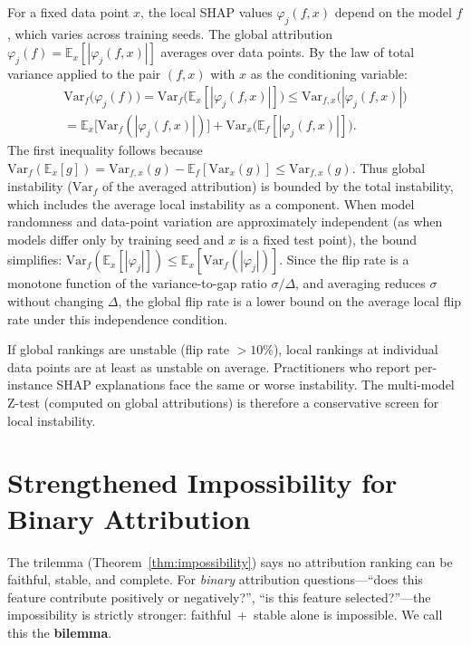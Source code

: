 \documentclass{jmlr}
\newcommand{\E}{\mathbb{E}}
\newcommand{\Var}{\mathrm{Var}}
\begin{document}
For a fixed data point $x$, the local SHAP values $\varphi_j(f, x)$ depend on the model $f$, which varies across training seeds. The global attribution $\varphi_j(f) = \E_x[|\varphi_j(f, x)|]$ averages over data points. By the law of total variance applied to the pair $(f, x)$ with $x$ as the conditioning variable:
\begin{multline*}
    \Var_f\!\big(\varphi_j(f)\big) = \Var_f\!\big(\E_x[|\varphi_j(f,x)|]\big) \leq \Var_{f,x}\!\big(|\varphi_j(f,x)|\big) \\
    = \E_x\!\big[\Var_f(|\varphi_j(f,x)|)\big] + \Var_x\!\big(\E_f[|\varphi_j(f,x)|]\big).
\end{multline*}
The first inequality follows because $\Var_f(\E_x[g]) = \Var_{f,x}(g) - \E_f[\Var_x(g)] \leq \Var_{f,x}(g)$.
Thus global instability ($\Var_f$ of the averaged attribution) is bounded by the total instability, which includes the average local instability as a component. When model randomness and data-point variation are approximately independent (as when models differ only by training seed and $x$ is a fixed test point), the bound simplifies: $\Var_f(\E_x[|\varphi_j|]) \leq \E_x[\Var_f(|\varphi_j|)]$.
Since the flip rate is a monotone function of the variance-to-gap ratio $\sigma/\Delta$, and averaging reduces $\sigma$ without changing $\Delta$, the global flip rate is a lower bound on the average local flip rate under this independence condition.

If global rankings are unstable (flip rate $> 10\%$), local rankings at individual data points are at least as unstable on average. Practitioners who report per-instance SHAP explanations face the same or worse instability. The multi-model Z-test (computed on global attributions) is therefore a conservative screen for local instability.


\section{Strengthened Impossibility for Binary Attribution}
\label{sec:bilemma}

The trilemma (Theorem~\ref{thm:impossibility}) says no attribution ranking can be faithful, stable, and complete.
For \emph{binary} attribution questions---``does this feature contribute positively or negatively?'', ``is this feature selected?''---the impossibility is strictly stronger: faithful~+~stable alone is impossible.
We call this the \textbf{bilemma}.
\end{document}
